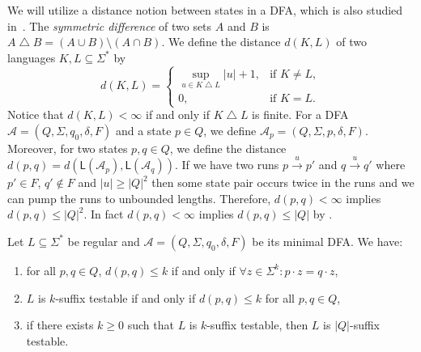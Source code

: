 \documentclass{theoretics}
\newcommand{\A}{\mathcal{A}}
\renewcommand{\L}{\mathsf{L}}
\renewcommand{\geq}{\geqslant}
\renewcommand{\leq}{\leqslant}
\renewcommand{\ge}{\geq}
\renewcommand{\le}{\leq}
\begin{document}
We will utilize a distance notion between states in a DFA,
which is also studied in~\cite{GawrychowskiJ09}.
The {\em symmetric difference} of two sets $A$ and $B$ is $A \mathop{\triangle} B = (A \cup B) \setminus (A \cap B)$.
We define the distance $d(K,L)$ of two languages $K,L\subseteq\Sigma^*$ by
\[
	d(K,L) = \begin{cases}
	\sup_{u \in K \mathop{\triangle} L} |u| + 1, & \text{if } K \neq L, \\
	0, & \text{if } K = L.
	\end{cases}
\]
Notice that $d(K,L)<\infty$ if and only if $K\mathop{\triangle} L$ is finite.
For a DFA $\A = (Q,\Sigma,q_0,\delta,F)$ and a state $p\in Q$, we define $\A_p = (Q,\Sigma,p,\delta,F)$.
Moreover, for two states $p,q\in Q$, we define the distance $d(p,q)=d(\L(\A_p),\L(\A_q))$.
If we have two runs $p \xrightarrow{u} p'$ and $q \xrightarrow{u} q'$ where $p' \in F$,
$q' \notin F$ and $|u| \ge |Q|^2$ then some state pair occurs twice in the runs
and we can pump the runs to unbounded lengths.
Therefore, $d(p,q) < \infty$ implies $d(p,q) \le |Q|^2$.
In fact $d(p,q) < \infty$ implies $d(p,q) \le |Q|$ by \cite[Lemma~1]{GawrychowskiJ09}.
	
\begin{lemma}
	\label{lem:testable-distance}
	Let $L \subseteq \Sigma^*$ be regular and $\A = (Q,\Sigma,q_0,\delta,F)$ be its minimal DFA. 
	We have:
	\begin{enumerate}[label=(\roman{*}), ref=(\roman{*})]
		\item for all $p,q \in Q$, $d(p,q) \le k$ if and only if $\forall z \in \Sigma^k : p \cdot z = q \cdot z$,
		\label{item:st1}
		\item $L$ is $k$-suffix testable if and only if $d(p,q) \le k$ for all $p,q \in Q$,
		\label{item:st2}
		\item if there exists $k \ge 0$ such that $L$ is $k$-suffix testable, then $L$ is $|Q|$-suffix testable.
		\label{item:st3}
	\end{enumerate}
\end{lemma}
\end{document}
